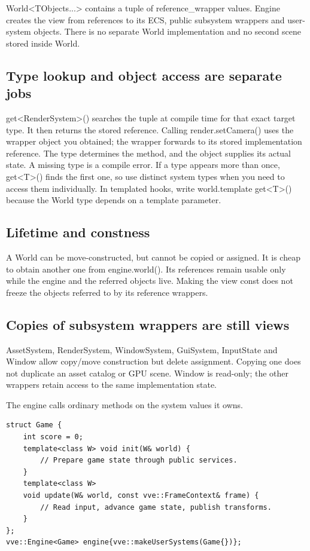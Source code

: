 \documentclass[11pt,a4paper]{article}
\begin{document}
World<TObjects...> contains a tuple of reference\_wrapper values. Engine creates the view from references to its ECS, public subsystem wrappers and user-system objects. There is no separate World implementation and no second scene stored inside World.

\subsection*{Type lookup and object access are separate jobs}
get<RenderSystem>() searches the tuple at compile time for that exact target type. It then returns the stored reference. Calling render.setCamera() uses the wrapper object you obtained; the wrapper forwards to its stored implementation reference. The type determines the method, and the object supplies its actual state. A missing type is a compile error. If a type appears more than once, get<T>() finds the first one, so use distinct system types when you need to access them individually. In templated hooks, write world.template get<T>() because the World type depends on a template parameter.

\subsection*{Lifetime and constness}
A World can be move-constructed, but cannot be copied or assigned. It is cheap to obtain another one from engine.world(). Its references remain usable only while the engine and the referred objects live. Making the view const does not freeze the objects referred to by its reference wrappers.

\subsection*{Copies of subsystem wrappers are still views}
AssetSystem, RenderSystem, WindowSystem, GuiSystem, InputState and Window allow copy/move construction but delete assignment. Copying one does not duplicate an asset catalog or GPU scene. Window is read-only; the other wrappers retain access to the same implementation state.

\label{core-10}
The engine calls ordinary methods on the system values it owns.

\begin{lstlisting}[language={}]
struct Game {
    int score = 0;
    template<class W> void init(W& world) {
        // Prepare game state through public services.
    }
    template<class W>
    void update(W& world, const vve::FrameContext& frame) {
        // Read input, advance game state, publish transforms.
    }
};
vve::Engine<Game> engine{vve::makeUserSystems(Game{})};
\end{lstlisting}
\end{document}
